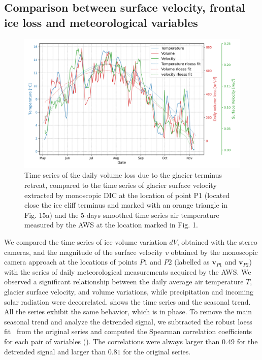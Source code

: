 \subsection{Comparison between surface velocity, frontal ice loss and meteorological
  variables}\label{sec:4:res_temp_comparison}

\begin{figure}
  \centering
  \includegraphics[width=158mm]{4_TS_P1.png}
  \caption{Time series of the daily volume loss due to the glacier terminus retreat,
    compared to the time series of glacier surface velocity extracted by monoscopic DIC
    at the location of point P1 (located close the ice cliff terminus and marked with an
    orange triangle in Fig. 15a) and the 5-days smoothed time series air temperature
    measured by the AWS at the location marked in Fig. 1.}
  \label{fig:4:TS_punto-fronte}
\end{figure}

We compared the time series of ice volume variation \(dV\), obtained with the stereo
cameras, and the magnitude of the surface velocity \(v\) obtained by the monoscopic
camera approach at the locations of points \(P1\) and \(P2\) (labelled as
\(\mathbf{v}_{P1}\) and \(\mathbf{v}_{P2}\)) with the series of daily
meteorological measurements acquired by the AWS.
We observed a significant relationship between the daily average air temperature \(T\),
glacier surface velocity, and volume variations, while precipitation and incoming solar
radiation were decorrelated.  shows the time series and
the seasonal trend.
All the series exhibit the same behavior, which is in phase.
To remove the main seasonal trend and analyze the detrended signal, we subtracted the
robust
loess fit~\citep{Cleveland1979} from the original series and computed the Spearman
correlation coefficients for each pair of variables
().
The correlations were always larger than \(0.49\) for the detrended signal and larger
than \(0.81\) for the original series.


